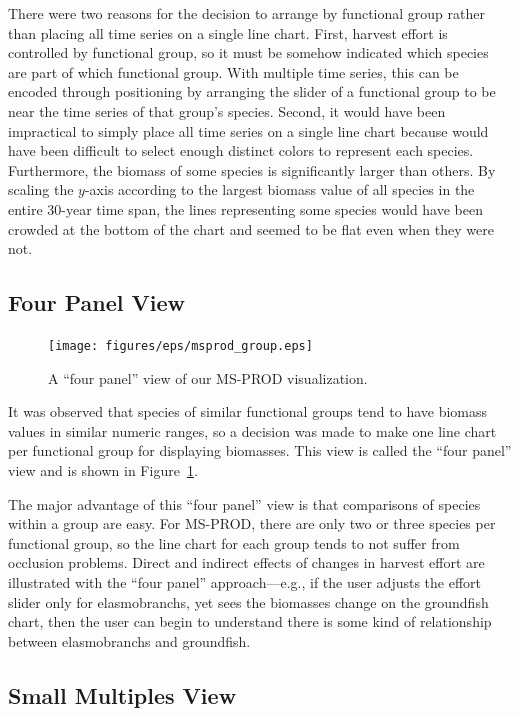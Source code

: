 There were two reasons for the decision to arrange by functional group rather than placing all time series on a single line chart.  First, harvest effort is controlled by functional group, so it must be somehow indicated which species are part of which functional group.  With multiple time series, this can be encoded through positioning by arranging the slider of a functional group to be near the time series of that group's species.  Second, it would have been impractical to simply place all time series on a single line chart because would have been difficult to select enough distinct colors to represent each species.  Furthermore, the biomass of some species is significantly larger than others.  By scaling the $y$-axis according to the largest biomass value of all species in the entire 30-year time span, the lines representing some species would have been crowded at the bottom of the chart and seemed to be flat even when they were not.

\subsection{Four Panel View}

\begin{figure}[h]
	\centering
	\texttt{[image: figures/eps/msprod\_group.eps]}
	\caption{A ``four panel'' view of our MS-PROD visualization.}
	\label{fig:msprod_group}
\end{figure}

It was observed that species of similar functional groups tend to have biomass values in similar numeric ranges, so a decision was made to make one line chart per functional group for displaying biomasses.  This view is called the ``four panel'' view and is shown in Figure~\ref{fig:msprod_group}.

The major advantage of this ``four panel'' view is that comparisons of species within a group are easy.  For MS-PROD, there are only two or three species per functional group, so the line chart for each group tends to not suffer from occlusion problems.  Direct and indirect effects of changes in harvest effort are illustrated with the ``four panel'' approach---e.g., if the user adjusts the effort slider only for elasmobranchs, yet sees the biomasses change on the groundfish chart, then the user can begin to understand there is some kind of relationship between elasmobranchs and groundfish.

\subsection{Small Multiples View}

